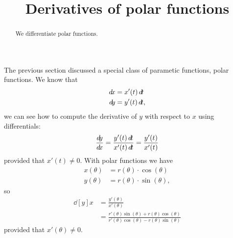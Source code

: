 \documentclass{ximera}
\title[Dig-In:]{Derivatives of polar functions}
\begin{document}
\begin{abstract}
  We differentiate polar functions.
\end{abstract}
\maketitle

The previous section discussed a special class of parametic functions,
polar functions.  We know that
\begin{align*}
  \d x &= x'(t) \d t\\
  \d y &= y'(t) \d t,
\end{align*}
we can see how to compute the derivative of $y$ with respect to $x$
using differentials:
\[
\frac{\d y}{\d x} = \frac{y'(t) \d t}{x'(t) \d t} = \frac{y'(t)}{x'(t)}
\]
provided that $x'(t) \ne 0$.
With polar functions we have
\begin{align*}
  x(\theta) &= r(\theta) \cdot \cos(\theta)\\
  y(\theta) &= r(\theta) \cdot \sin(\theta),
\end{align*}
so
\begin{align*}
\dd[y]{x} &= \frac{y'(\theta)}{x'(\theta)} \\
&= \frac{r'(\theta)\sin(\theta)+r(\theta)\cos(\theta)}{r'(\theta)\cos(\theta)-r(\theta)\sin(\theta)}
\end{align*}
provided that $x'(\theta)\ne 0$.
\end{document}
